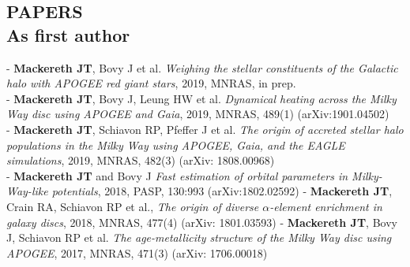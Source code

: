 \documentclass[margin]{res}
\begin{document}
\begin{resume}
\section{PAPERS\\ As first author}
\par
- \textbf{Mackereth JT}, Bovy J et al. \emph{Weighing the stellar constituents of the Galactic halo with APOGEE red giant stars}, 2019, MNRAS, in prep. \\
- \textbf{Mackereth JT}, Bovy J, Leung HW et al. \emph{Dynamical heating across the Milky Way disc using APOGEE and Gaia}, 2019, MNRAS, 489(1) (arXiv:1901.04502) \\
- \textbf{Mackereth JT}, Schiavon RP, Pfeffer J et al. \emph{The origin of accreted stellar halo populations in the Milky Way using APOGEE, Gaia, and the EAGLE simulations}, 2019, MNRAS, 482(3) (arXiv: 1808.00968) \\
- \textbf{Mackereth JT} and Bovy J \emph{Fast estimation of orbital parameters in Milky-Way-like potentials}, 2018, PASP, 130:993 (arXiv:1802.02592)
\newline - \textbf{Mackereth JT}, Crain RA, Schiavon RP et al., \emph{The origin of diverse $\alpha$-element enrichment in galaxy discs}, 2018, MNRAS, 477(4) (arXiv: 1801.03593) 
\newline - \textbf{Mackereth JT}, Bovy J, Schiavon RP et al. \emph{The age-metallicity structure of the Milky Way disc using APOGEE}, 2017, MNRAS, 471(3) (arXiv: 1706.00018)


\end{resume}
\end{document}
